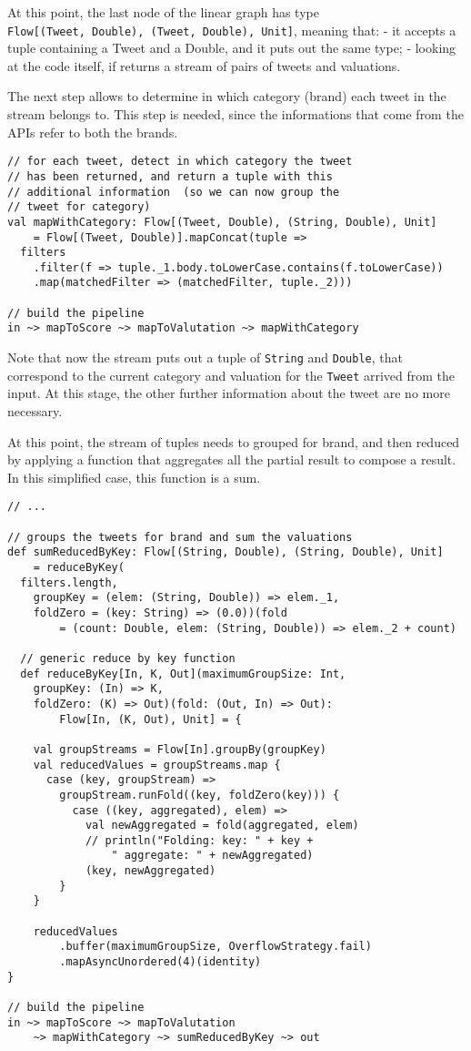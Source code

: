 At this point, the last node of the linear graph has type
\texttt{Flow{[}(Tweet,\ Double),\ (Tweet,\ Double),\ Unit{]}}, meaning
that: - it accepts a tuple containing a Tweet and a Double, and it puts
out the same type; - looking at the code itself, if returns a stream of
pairs of tweets and valuations.

The next step allows to determine in which category (brand) each tweet
in the stream belongs to. This step is needed, since the informations
that come from the APIs refer to both the brands.

\begin{verbatim}
// for each tweet, detect in which category the tweet
// has been returned, and return a tuple with this 
// additional information  (so we can now group the 
// tweet for category)
val mapWithCategory: Flow[(Tweet, Double), (String, Double), Unit]
    = Flow[(Tweet, Double)].mapConcat(tuple =>
  filters
    .filter(f => tuple._1.body.toLowerCase.contains(f.toLowerCase))
    .map(matchedFilter => (matchedFilter, tuple._2)))

// build the pipeline
in ~> mapToScore ~> mapToValutation ~> mapWithCategory
\end{verbatim}

Note that now the stream puts out a tuple of \texttt{String} and
\texttt{Double}, that correspond to the current category and valuation
for the \texttt{Tweet} arrived from the input. At this stage, the other
further information about the tweet are no more necessary.

At this point, the stream of tuples needs to grouped for brand, and then
reduced by applying a function that aggregates all the partial result to
compose a result. In this simplified case, this function is a sum.

\begin{verbatim}
// ...

// groups the tweets for brand and sum the valuations
def sumReducedByKey: Flow[(String, Double), (String, Double), Unit]
    = reduceByKey(
  filters.length,
    groupKey = (elem: (String, Double)) => elem._1,
    foldZero = (key: String) => (0.0))(fold
        = (count: Double, elem: (String, Double)) => elem._2 + count)

  // generic reduce by key function
  def reduceByKey[In, K, Out](maximumGroupSize: Int,
    groupKey: (In) => K,
    foldZero: (K) => Out)(fold: (Out, In) => Out):
        Flow[In, (K, Out), Unit] = {

    val groupStreams = Flow[In].groupBy(groupKey)
    val reducedValues = groupStreams.map {
      case (key, groupStream) =>
        groupStream.runFold((key, foldZero(key))) {
          case ((key, aggregated), elem) =>
            val newAggregated = fold(aggregated, elem)
            // println("Folding: key: " + key +
                " aggregate: " + newAggregated)
            (key, newAggregated)
        }
    }

    reducedValues
        .buffer(maximumGroupSize, OverflowStrategy.fail)
        .mapAsyncUnordered(4)(identity)
}

// build the pipeline
in ~> mapToScore ~> mapToValutation
    ~> mapWithCategory ~> sumReducedByKey ~> out
\end{verbatim}

